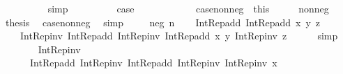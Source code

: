 \begin{isabellebody}
\ \ \ \ \ \ \ \ \isamarkupfalse%
\ simp\isanewline
\ \ \ \ \ \ \isamarkupfalse%
\ \isamarkupfalse%
\ {\isacharquery}{\kern0pt}case\ \isacommand{{\isachardot}{\kern0pt}}\isamarkupfalse%
\isanewline
\ \ \ \ \isamarkupfalse%
\isanewline
\ \ \isacommand{{\isacharbraceright}{\kern0pt}}\isamarkupfalse%
\isanewline
\ \ \isamarkupfalse%
\ case{\isacharunderscore}{\kern0pt}nonneg\ {\isacharequal}{\kern0pt}\ this\isanewline
\ \ \isacommand{{\isacharbraceleft}{\kern0pt}}\isamarkupfalse%
\ \isamarkupfalse%
\ {\isacharparenleft}{\kern0pt}nonneg\ {\isacharunderscore}{\kern0pt}{\isacharparenright}{\kern0pt}\ \isamarkupfalse%
\ \isamarkupfalse%
\ {\isacharquery}{\kern0pt}thesis\ \isamarkupfalse%
\ case{\isacharunderscore}{\kern0pt}nonneg\ \isamarkupfalse%
\ simp\ \isacommand{{\isacharbraceright}{\kern0pt}}\isamarkupfalse%
\isanewline
\ \ \isamarkupfalse%
\ {\isacharparenleft}{\kern0pt}neg\ n{\isacharparenright}{\kern0pt}\isanewline
\ \ \isamarkupfalse%
\ {\isachardoublequoteopen}Int{\isacharunderscore}{\kern0pt}Rep{\isacharunderscore}{\kern0pt}add\ {\isacharparenleft}{\kern0pt}Int{\isacharunderscore}{\kern0pt}Rep{\isacharunderscore}{\kern0pt}add\ x\ y{\isacharparenright}{\kern0pt}\ z\ {\isacharequal}{\kern0pt}\isanewline
\ \ \ \ Int{\isacharunderscore}{\kern0pt}Rep{\isacharunderscore}{\kern0pt}inv\ {\isacharparenleft}{\kern0pt}Int{\isacharunderscore}{\kern0pt}Rep{\isacharunderscore}{\kern0pt}add\ {\isacharparenleft}{\kern0pt}Int{\isacharunderscore}{\kern0pt}Rep{\isacharunderscore}{\kern0pt}inv\ {\isacharparenleft}{\kern0pt}Int{\isacharunderscore}{\kern0pt}Rep{\isacharunderscore}{\kern0pt}add\ x\ y{\isacharparenright}{\kern0pt}{\isacharparenright}{\kern0pt}\ {\isacharparenleft}{\kern0pt}Int{\isacharunderscore}{\kern0pt}Rep{\isacharunderscore}{\kern0pt}inv\ z{\isacharparenright}{\kern0pt}{\isacharparenright}{\kern0pt}{\isachardoublequoteclose}\isanewline
\ \ \ \ \isamarkupfalse%
\ simp\isanewline
\ \ \isamarkupfalse%
\ \isamarkupfalse%
\isanewline
\ \ \ \ {\isachardoublequoteopen}{\isachardot}{\kern0pt}{\isachardot}{\kern0pt}{\isachardot}{\kern0pt}\ {\isacharequal}{\kern0pt}\ Int{\isacharunderscore}{\kern0pt}Rep{\isacharunderscore}{\kern0pt}inv\ {\isacharparenleft}{\kern0pt}\isanewline
\ \ \ \ \ \ Int{\isacharunderscore}{\kern0pt}Rep{\isacharunderscore}{\kern0pt}add\ {\isacharparenleft}{\kern0pt}Int{\isacharunderscore}{\kern0pt}Rep{\isacharunderscore}{\kern0pt}inv\ {\isacharparenleft}{\kern0pt}Int{\isacharunderscore}{\kern0pt}Rep{\isacharunderscore}{\kern0pt}add\ {\isacharparenleft}{\kern0pt}Int{\isacharunderscore}{\kern0pt}Rep{\isacharunderscore}{\kern0pt}inv\ {\isacharparenleft}{\kern0pt}Int{\isacharunderscore}{\kern0pt}Rep{\isacharunderscore}{\kern0pt}inv\ x{\isacharparenright}{\kern0pt}{\isacharparenright}{\kern0pt}\isanewline

\end{isabellebody}
